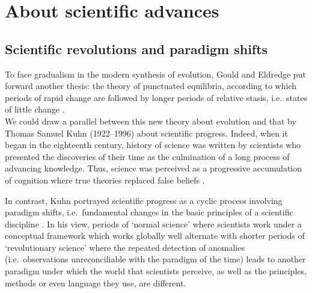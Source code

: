 \section{About scientific advances}
\subsection{Scientific revolutions and paradigm shifts} 


To face gradualism in the modern synthesis of evolution, Gould and Eldredge put forward another thesis: the theory of punctuated equilibria, according to which periods of rapid change are followed by longer periods of relative stasis, i.e.\ states of little change \citep{gould1972punctuated}.\\

We could draw a parallel between this new theory about evolution and that by Thomas Samuel Kuhn (1922--1996) about scientific progress.
Indeed, when it began in the eighteenth century, history of science was written by scientists who presented the discoveries of their time as the culmination of a long process of advancing knowledge.
Thus, science was perceived as a progressive accumulation of cognition where true theories replaced false beliefs \citep{golinski2008making}.

In contrast, Kuhn portrayed scientific progress as a cyclic process involving paradigm shifts, i.e.\ fundamental changes in the basic principles of a scientific discipline \citep{kuhn1962structure}.
In his view, periods of ‘normal science’ where scientists work under a conceptual framework which works globally well alternate with shorter periods of ‘revolutionary science’ where the repeated detection of anomalies (i.e.\ observations unreconciliable with the paradigm of the time) leads to another paradigm under which the world that scientists perceive, as well as the principles, methods or even language they use, are different.\\

